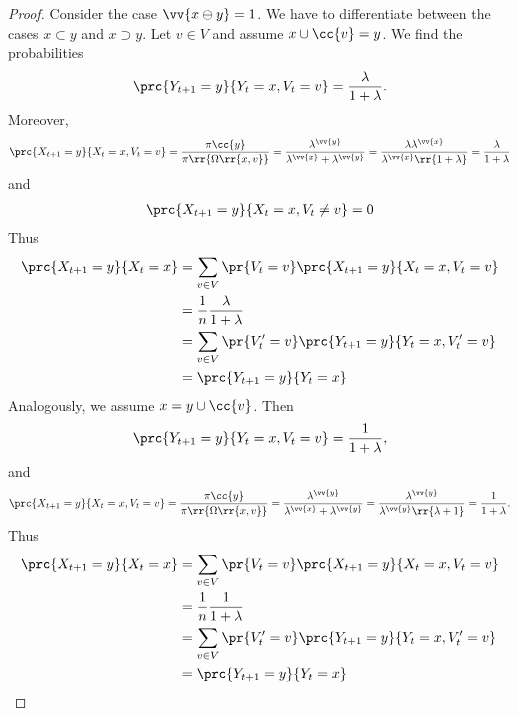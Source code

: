 \documentclass{article}
\begin{document}
\begin{claim*}[1]
\begin{proof}
    Consider the case $\vv{x\ominus y}=1$. We have to differentiate between the cases
    $x\subset y$ and $x\supset y$. Let $v\in V$ and assume $x\cup\cc{v}=y$. We find the probabilities
    \begin{align*}
      \prc{Y_{t+1}=y}{Y_t=x, V_t=v} = \frac{\lambda}{1+\lambda}.
    \end{align*}
    Moreover,
    \begin{align*}
      \prc{X_{t+1}=y}{X_t=x, V_t=v}
      = \frac{\pi\cc{y}}{\pi\rr{\Omega\rr{x,v}}}
      = \frac{\lambda^{\vv{y}}}{\lambda^{\vv{x}}+\lambda^{\vv{y}}}
      = \frac{\lambda\lambda^{\vv{x}}}{\lambda^{\vv{x}}\rr{1+\lambda}}
      = \frac{\lambda}{1+\lambda}
    \end{align*}
    and
    \begin{align*}
      \prc{X_{t+1}=y}{X_t=x, V_t\neq v} = 0
    \end{align*}
    Thus
    \begin{align*}
      \prc{X_{t+1}=y}{X_t=x} &= \sum_{v\in V} \pr{V_t=v}\prc{X_{t+1}=y}{X_t=x, V_t= v} \\
                             &= \frac{1}{n} \frac{\lambda}{1+\lambda} \\
                             &= \sum_{v\in V} \pr{V'_t=v}\prc{Y_{t+1}=y}{Y_t=x, V'_t= v} \\
                             &=\prc{Y_{t+1}=y}{Y_t=x}
    \end{align*}
    Analogously, we assume $x=y\cup\cc{v}$. Then
    \begin{align*}
      \prc{Y_{t+1}=y}{Y_t=x, V_t=v} = \frac{1}{1+\lambda},
    \end{align*}
    and
    \begin{align*}
      \prc{X_{t+1}=y}{X_t=x, V_t=v}
      = \frac{\pi\cc{y}}{\pi\rr{\Omega\rr{x,v}}}
      = \frac{\lambda^{\vv{y}}}{\lambda^{\vv{x}}+\lambda^{\vv{y}}}
      = \frac{\lambda^{\vv{y}}}{\lambda^{\vv{y}}\rr{\lambda+1}}
      = \frac{1}{1+\lambda}.
    \end{align*}
    Thus
    \begin{align*}
      \prc{X_{t+1}=y}{X_t=x} &= \sum_{v\in V} \pr{V_t=v}\prc{X_{t+1}=y}{X_t=x, V_t= v} \\
                             &= \frac{1}{n} \frac{1}{1+\lambda} \\
                             &= \sum_{v\in V} \pr{V'_t=v}\prc{Y_{t+1}=y}{Y_t=x, V'_t= v} \\
                             &=\prc{Y_{t+1}=y}{Y_t=x}
    \end{align*}


\end{proof}
\end{claim*}
\end{document}
